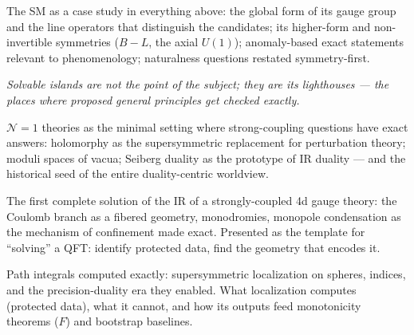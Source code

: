 The SM as a case study in everything above: the global form of its gauge group and the line operators that distinguish the candidates; its higher-form and non-invertible symmetries ($B-L$, the axial $U(1)$); anomaly-based exact statements relevant to phenomenology; naturalness questions restated symmetry-first.


\noin \emph{Solvable islands are not the point of the subject; they are its lighthouses --- the places where proposed general principles get checked exactly.}

$\mathcal{N}=1$ theories as the minimal setting where strong-coupling questions have exact answers: holomorphy as the supersymmetric replacement for perturbation theory; moduli spaces of vacua; Seiberg duality as the prototype of IR duality --- and the historical seed of the entire duality-centric worldview.

The first complete solution of the IR of a strongly-coupled 4d gauge theory: the Coulomb branch as a fibered geometry, monodromies, monopole condensation as the mechanism of confinement made exact. Presented as the template for ``solving'' a QFT: identify protected data, find the geometry that encodes it.

Path integrals computed exactly: supersymmetric localization on spheres, indices, and the precision-duality era they enabled. What localization computes (protected data), what it cannot, and how its outputs feed monotonicity theorems ($F$) and bootstrap baselines.

